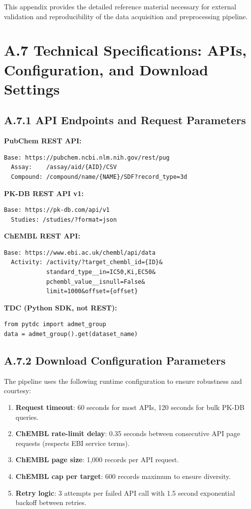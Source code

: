 \documentclass[a4paper,11pt,twoside]{report}
\begin{document}
This appendix provides the detailed reference material necessary for external validation and reproducibility of the data acquisition and preprocessing pipeline.

\section*{A.7 Technical Specifications: APIs, Configuration, and Download Settings}

\subsection*{A.7.1 API Endpoints and Request Parameters}

\noindent \textbf{PubChem REST API:}
\begin{verbatim}
Base: https://pubchem.ncbi.nlm.nih.gov/rest/pug
  Assay:    /assay/aid/{AID}/CSV
  Compound: /compound/name/{NAME}/SDF?record_type=3d
\end{verbatim}

\noindent \textbf{PK-DB REST API v1:}
\begin{verbatim}
Base: https://pk-db.com/api/v1
  Studies: /studies/?format=json
\end{verbatim}

\noindent \textbf{ChEMBL REST API:}
\begin{verbatim}
Base: https://www.ebi.ac.uk/chembl/api/data
  Activity: /activity/?target_chembl_id={ID}&
            standard_type__in=IC50,Ki,EC50&
            pchembl_value__isnull=False&
            limit=1000&offset={offset}
\end{verbatim}

\noindent \textbf{TDC (Python SDK, not REST):}
\begin{verbatim}
from pytdc import admet_group
data = admet_group().get(dataset_name)
\end{verbatim}

\subsection*{A.7.2 Download Configuration Parameters}

The pipeline uses the following runtime configuration to ensure robustness and courtesy:
\begin{enumerate}
\item \textbf{Request timeout}: 60 seconds for most APIs, 120 seconds for bulk PK-DB queries.
\item \textbf{ChEMBL rate-limit delay}: 0.35 seconds between consecutive API page requests (respects EBI service terms).
\item \textbf{ChEMBL page size}: 1,000 records per API request.
\item \textbf{ChEMBL cap per target}: 600 records maximum to ensure diversity.
\item \textbf{Retry logic}: 3 attempts per failed API call with 1.5 second exponential backoff between retries.
\end{enumerate}
\end{document}
